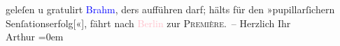                geleſen u gratulirt \textcolor{blue}{Brahm}{}\ledrightnote{\textcolor{blue}{Otto Brahm}}, ders aufführen darf;
               hälts für den »pupillarſichern Senſationserfolg{[}«{]}, fährt nach \textcolor{pink}{Berlin}{}\ledrightnote{\textcolor{pink}{Berlin}} zur \textsc{Première}. –\pend
           \pstart
           Herzlich Ihr{\\[\baselineskip]}\spacefill\mbox{Arthur}\pend
           \leftskip=0em{}\endnumbering{}  
      